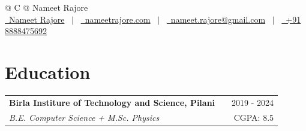 \documentclass[a4paper,9pt]{article}
\makeatletter
\newcommand{\educationitem}[4]{
    \begin{tabularx}{\linewidth}{@{}l X r@{}}
    \textbf{#1} & & #3 \\
    \textit{#2} & & #4 \\[3.75pt]
    \end{tabularx}
}
\makeatother
\begin{document}
\pagestyle{empty} 


\vspace{-2mm}
\begin{tabularx}{\linewidth}{@{} C @{}}
\Huge{Nameet Rajore} \\[7.5pt]
\href{https://linkedin.com/in/nameet-rajore}{\raisebox{-0.05\height}\faLinkedin\ Nameet Rajore} \ $|$ \ 
\href{https://nameetrajore.com}{\raisebox{-0.05\height}\faGlobe \ nameetrajore.com} \ $|$ \ 
\href{mailto:nameet.rajore@gmail.com}{\raisebox{-0.05\height}\faEnvelope \ nameet.rajore@gmail.com} \ $|$ \ 
\href{tel:+918888475692}{\raisebox{-0.05\height}\faMobile \ +91 8888475692} \\
\end{tabularx}

\section{Education}
\educationitem{Birla Institure of Technology and Science, Pilani}{B.E. Computer Science + M.Sc. Physics}{2019 - 2024}{CGPA: 8.5}

\end{document}
